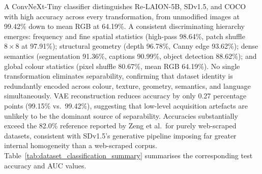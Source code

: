 A ConvNeXt-Tiny classifier distinguishes Re-LAION-5B, SDv1.5, and COCO with high
accuracy across every transformation, from unmodified images at 99.42\% down to mean RGB
at 64.19\%. A consistent discriminating hierarchy emerges: frequency and fine spatial
statistics (high-pass 98.64\%, patch shuffle $8{\times}8$ at 97.91\%); structural
geometry (depth 96.78\%, Canny edge 93.62\%); dense semantics (segmentation 91.36\%,
captions 90.99\%, object detection 88.62\%); and global colour statistics (pixel shuffle
80.67\%, mean RGB 64.19\%). No single transformation eliminates separability, confirming
that dataset identity is redundantly encoded across colour, texture, geometry, semantics,
and language simultaneously. VAE reconstruction reduces accuracy by only 0.27 percentage
points (99.15\% vs.\ 99.42\%), suggesting that low-level acquisition artefacts are
unlikely to be the dominant source of separability. Accuracies substantially exceed
the 82.0\% reference reported by Zeng et al.\ for purely web-scraped datasets,
consistent with SDv1.5's generative pipeline imposing far greater internal homogeneity than a web-scraped corpus. Table~\ref{tab:dataset_classification_summary} summarises the corresponding test accuracy and AUC values.


